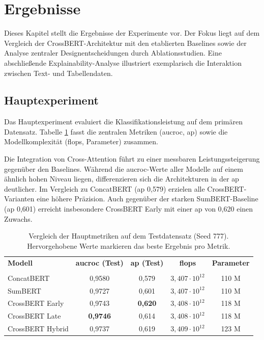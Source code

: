 \section{Ergebnisse}
\label{sec:ergebnisse}

Dieses Kapitel stellt die Ergebnisse der Experimente vor. Der Fokus liegt auf dem Vergleich der CrossBERT-Architektur mit den etablierten Baselines sowie der Analyse zentraler Designentscheidungen durch Ablationsstudien. Eine abschließende Explainability-Analyse illustriert exemplarisch die Interaktion zwischen Text- und Tabellendaten.

\subsection{Hauptexperiment}
\label{sec:hauptexperiment}

Das Hauptexperiment evaluiert die Klassifikationsleistung auf dem primären Datensatz. Tabelle \ref{tab:main_results} fasst die zentralen Metriken (\Gls{aucroc}, \Gls{ap}) sowie die Modellkomplexität (\Gls{flops}, Parameter) zusammen.

Die Integration von Cross-Attention führt zu einer messbaren Leistungssteigerung gegenüber den Baselines. Während die \Gls{aucroc}-Werte aller Modelle auf einem ähnlich hohen Niveau liegen, differenzieren sich die Architekturen in der \Gls{ap} deutlicher. Im Vergleich zu ConcatBERT (\Gls{ap} 0{,}579) erzielen alle CrossBERT-Varianten eine höhere Präzision. Auch gegenüber der starken SumBERT-Baseline (\Gls{ap} 0{,}601) erreicht insbesondere CrossBERT Early mit einer \Gls{ap} von 0{,}620 einen Zuwachs.

\begin{table}[ht]
    \centering
    \small
    \caption{Vergleich der Hauptmetriken auf dem Testdatensatz (Seed 777). Hervorgehobene Werte markieren das beste Ergebnis pro Metrik.}
    \label{tab:main_results}
    \begin{tabular}{lcccc}
        \hline
        \textbf{Modell} & \textbf{\Gls{aucroc} (Test)} & \textbf{\Gls{ap} (Test)} & \textbf{\Gls{flops}} & \textbf{Parameter} \\
         &  &  & & \\
        \hline
        ConcatBERT & 0{,}9580 & 0{,}579 & $3{,}407 \cdot 10^{12}$ & 110 M \\
        SumBERT & 0{,}9727 & 0{,}601 & $3{,}407 \cdot 10^{12}$ & 110 M \\
        CrossBERT Early & 0{,}9743 & \textbf{0{,}620} & $3{,}408 \cdot 10^{12}$ & 118 M \\
        CrossBERT Late & \textbf{0{,}9746} & 0{,}614 & $3{,}408 \cdot 10^{12}$ & 118 M \\
        CrossBERT Hybrid & 0{,}9737 & 0{,}619 & $3{,}409 \cdot 10^{12}$ & 123 M \\
        \hline
    \end{tabular}
\end{table}

